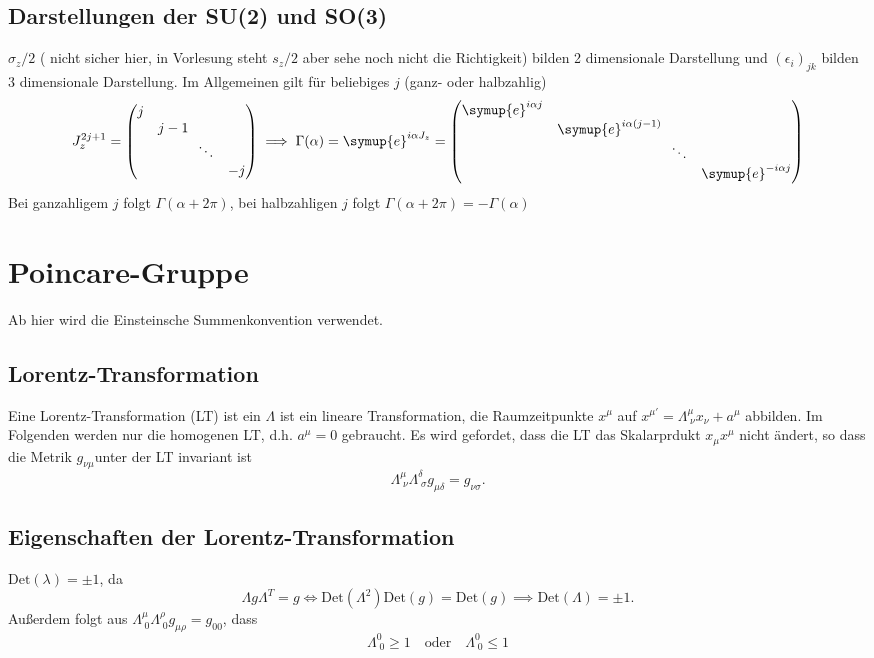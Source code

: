 \documentclass[
  captions=tableheading,  %
  titlepage=firstiscover, %
]{scrartcl}
\begin{document}
\subsection{Darstellungen der SU(2) und SO(3)}
$\sigma_z/2$ ({\color{red} nicht sicher hier, in Vorlesung steht $s_z/2$ 
aber sehe noch nicht die Richtigkeit}) bilden 2 dimensionale Darstellung und $(\epsilon_i)_{jk}$ bilden 3 dimensionale Darstellung.
Im Allgemeinen gilt für beliebiges $j$ (ganz- oder halbzahlig) 
\begin{equation*}
  J_z^{2j+1} = 
  \begin{pmatrix}
    j & & &  \\
    & j - 1 & & \\
    & & \! \!  \ddots & \\
    & & & -j
  \end{pmatrix}
  \implies \Gamma(\alpha) = \symup{e}^{i\alpha J_z} = 
  \begin{pmatrix}
    \symup{e}^{i\alpha j} & & &  \\
    & \symup{e}^{i\alpha (j-1)} & & \\
    & & \! \!  \ddots & \\
    & & & \symup{e}^{- i\alpha j}
  \end{pmatrix}
\end{equation*}
Bei ganzahligem $j$ folgt $\Gamma(\alpha +2\pi)$, bei halbzahligen $j$ folgt $\Gamma(\alpha + 2\pi) = - 
\Gamma(\alpha)$
\section{Poincare-Gruppe}
Ab hier wird die Einsteinsche Summenkonvention verwendet.
\subsection{Lorentz-Transformation}
Eine Lorentz-Transformation (LT) ist ein $\Lambda$ ist ein lineare Transformation, die 
Raumzeitpunkte $x^{\mu}$  auf  $x^{\mu ' } = \Lambda_{\; \nu}^{\mu} x_{\nu} + a^{\mu}$ abbilden.
Im Folgenden werden nur die homogenen LT, d.h. $a^{\mu} = 0$ gebraucht.
Es wird gefordet, dass die LT das Skalarprdukt $x_{\mu}x^{\mu}$ nicht ändert, so dass die Metrik $g_{\nu \mu}$unter 
der LT invariant ist 
\begin{equation*}
  \Lambda_{\; \nu}^{\mu} \Lambda_{\; \sigma}^{\delta} g_{\mu \delta} = g_{\nu \sigma}.
\end{equation*}
\subsection{Eigenschaften der Lorentz-Transformation}
$\text{Det}(\lambda) = \pm 1$, da 
\begin{equation*}
  \Lambda g \Lambda^T = g \iff \text{Det}(\Lambda^2) \text{Det}(g) = \text{Det}(g) \implies 
  \text{Det}(\Lambda) = \pm 1.
\end{equation*}
Außerdem folgt aus $\Lambda_{\; 0}^{\mu} \Lambda_{\; 0}^{\rho} g_{\mu \rho} = g_{0 0}$, dass 
\begin{equation*}
  \Lambda_{\; 0}^{0} \geq 1 \quad \text{oder} \quad \Lambda_{\; 0}^{0} \leq 1 
\end{equation*}
\end{document}
